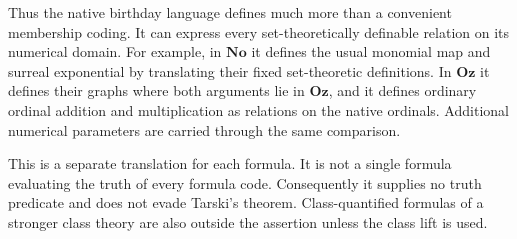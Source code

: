 \documentclass[11pt,letterpaper]{article}
\theoremstyle{definition}
\theoremstyle{remark}
\newcommand{\No}{\mathbf{No}}
\newcommand{\Oz}{\mathbf{Oz}}
\begin{document}
Thus the native birthday language defines much more than a convenient membership
coding. It can express every set-theoretically definable relation on its numerical
domain. For example, in $\No$ it defines the usual monomial map and surreal
exponential by translating their fixed set-theoretic definitions. In $\Oz$ it
defines their graphs where both arguments lie in $\Oz$, and it defines ordinary
ordinal addition and multiplication as relations on the native ordinals.
Additional numerical parameters are carried through the same comparison.

This is a separate translation for each formula. It is not a single formula
evaluating the truth of every formula code. Consequently it supplies no truth
predicate and does not evade Tarski's theorem. Class-quantified formulas of a
stronger class theory are also outside the assertion unless the class lift is
used.
\end{document}
